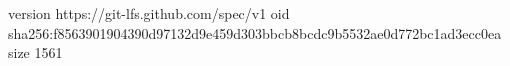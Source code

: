 version https://git-lfs.github.com/spec/v1
oid sha256:f8563901904390d97132d9e459d303bbcb8bcdc9b5532ae0d772bc1ad3ecc0ea
size 1561
